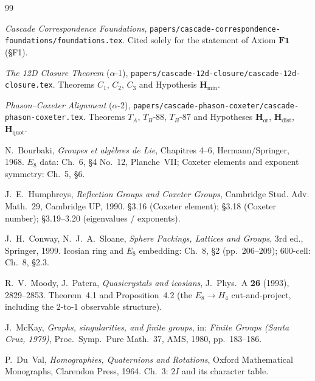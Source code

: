 \documentclass[11pt, a4paper]{amsart}
\theoremstyle{definition}
\newcommand{\Hmin}{\mathbf{H}_{\min}}
\newcommand{\Hor}{\mathbf{H}_{\mathrm{or}}}
\newcommand{\Hdist}{\mathbf{H}_{\mathrm{dist}}}
\newcommand{\Hquot}{\mathbf{H}_{\mathrm{quot}}}
\begin{document}
\begin{thebibliography}{99}

\emph{Cascade Correspondence Foundations},
\texttt{papers/cascade-correspondence-foundations/foundations.tex}.
Cited solely for the statement of Axiom $\mathbf{F1}$ (\S F1).

\emph{The 12D Closure Theorem} ($\alpha$-1),
\texttt{papers/cascade-12d-closure/cascade-12d-closure.tex}.
Theorems $C_1$, $C_2$, $C_3$ and Hypothesis $\Hmin$.

\emph{Phason--Coxeter Alignment} ($\alpha$-2),
\texttt{papers/cascade-phason-coxeter/cascade-phason-coxeter.tex}.
Theorems $T_A$, $T_B$-$88$, $T_B$-$87$ and Hypotheses
$\Hor$, $\Hdist$, $\Hquot$.

N.~Bourbaki, \emph{Groupes et alg\`ebres de Lie}, Chapitres
4--6, Hermann/Springer, 1968. $E_8$ data: Ch.~6, \S4 No.~12,
Planche~VII; Coxeter elements and exponent symmetry: Ch.~5,
\S6.

J.~E.~Humphreys, \emph{Reflection Groups and Coxeter Groups},
Cambridge Stud. Adv. Math.~29, Cambridge UP, 1990.
\S 3.16 (Coxeter element); \S 3.18 (Coxeter number);
\S 3.19--3.20 (eigenvalues / exponents).

J.~H.~Conway, N.~J.~A.~Sloane, \emph{Sphere Packings,
Lattices and Groups}, 3rd ed., Springer, 1999. Icosian
ring and $E_8$ embedding: Ch.~8, \S2 (pp.~206--209);
$600$-cell: Ch.~8, \S2.3.

R.~V.~Moody, J.~Patera, \emph{Quasicrystals and icosians},
J.~Phys.~A \textbf{26} (1993), 2829--2853. Theorem~4.1 and
Proposition~4.2 (the $E_8 \to H_4$ cut-and-project, including
the $2$-to-$1$ observable structure).

J.~McKay, \emph{Graphs, singularities, and finite groups},
in: \emph{Finite Groups (Santa Cruz, 1979)},
Proc.~Symp.~Pure Math.~37, AMS, 1980, pp.~183--186.

P.~Du~Val, \emph{Homographies, Quaternions and Rotations},
Oxford Mathematical Monographs, Clarendon Press, 1964.
Ch.~3: $2I$ and its character table.

\end{thebibliography}
\end{document}
